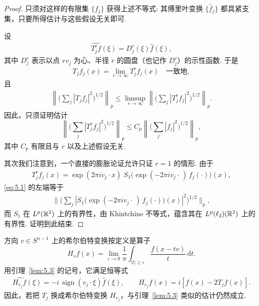 \begin{proof}
只须对这样的有限集 $\{f_j\}$ 获得上述不等式: 其傅里叶变换 $\{\widehat{f}_j\}$ 都具紧支集，只要所得估计与这些假设无关即可.

设
\begin{align*}
  \widehat{T_{j}^{r}f}(\xi)=D_{j}^{r}(\xi)\widehat{f}(\xi),
\end{align*}
其中 $D_{j}^{r}$ 表示以点 $rv_{j}$ 为心、半径 $r$ 的圆盘（也记作 $D_{j}^{r}$）的示性函数. 于是
\begin{align*}
  T_{j}f_{j}(x)=\lim_{r\to\infty}T_{j}^{r}f_{j}(x)\quad\text{一致地},
\end{align*}
且
\begin{align*}
  \left\|\Big(\sum_{j}|T_{j}f_{j}|^{2}\Big)^{1/2}\right\|_{p}
  \leq\limsup_{r\rightarrow\infty}
  \left\|\Big(\sum_{j}|T_{j}^{r}f_{j}|^{2}\Big)^{1/2}\right\|_{p}.
\end{align*}
因此，只须证明估计
\begin{equation}\label{eq:5.1}
  \left\|\Big(\sum_{j}|T_{j}^{r}f_{j}|^{2}\Big)^{1/2}\right\|_{p}
  \leq C_{p}\left\|\Big(\sum_{j}\left|f_{j}\right|^{2}\Big)^{1/2}\right\|_{p},
\end{equation}
其中 $C_{p}$ 有限且与 $r$ 以及上述假设无关.

其次我们注意到，一个直接的膨胀论证允许只证 $r = 1$ 的情形. 由于
\begin{align*}
  T_{j}^{r}f_{j}(x)=\exp(2\pi i v_{j}\cdot x)\;S_{1}\bigl(\exp(-2\pi i v_{j}\cdot\,)\,f_{j}(\cdot)\bigr)(x),
\end{align*}
\eqref{eq:5.1} 的左端等于
\begin{align*}
  \Big\|\Big(\sum_{j}|S_{1}\bigl(\exp(-2\pi i v_{j}\cdot\,)\,f_{j}(\cdot)\bigr)(x)|^{2}\Big)^{1/2}\Big\|_{p},
\end{align*}
而 $S_1$ 在 $L^p(\mathbb{R}^2)$ 上的有界性，由 Khintchine 不等式，蕴含其在 $L^p(\ell_2)(\mathbb{R}^2)$ 上的有界性. 证明到此结束.
\end{proof}

\begin{remark}\label{rem:5.4}
方向 $v \in S^{n-1}$ 上的希尔伯特变换按定义是算子
\begin{equation}\label{eq:5.2}
  H_{v}f(x)=\lim_{\varepsilon\to 0}\frac{1}{\pi}\int_{|t|\geq\varepsilon}\frac{f(x-t v)}{t}\,\mathrm{d}t.
\end{equation}
用引理~\ref{lem:5.3} 的记号，它满足恒等式
\begin{align*}
  \widehat{H_{v_{j}}f}(\xi)=-i\,\operatorname{sign}(v_{j}\cdot\xi)\widehat{f}(\xi),
  \qquad
  H_{v_{j}}f(x)=i\left[f(x)-2T_{j}f(x)\right].
\end{align*}
因此，若把 $T_j$ 换成希尔伯特变换 $H_{v_j}$，与引理~\ref{lem:5.3} 类似的估计仍然成立.
\end{remark}

